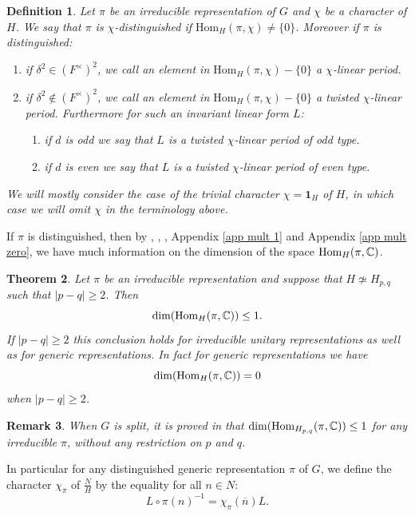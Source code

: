 \documentclass[11pt,letterpaper]{amsart}
\newcommand{\Hom}{\mathrm{Hom}}
\newcommand{\triv}{{\mathbf{1}}}
\def\d{\delta}
\theoremstyle{plain}
\newtheorem{thm}{Theorem}[section] \newtheorem{cor}[thm]{Corollary}
\newtheorem{df}[thm]{Definition}
\newtheorem {rem}[thm]{Remark} \newtheorem{ex}[thm]{Example}
\numberwithin{equation}{section}
\begin{document}
\begin{df}
Let $\pi$ be an irreducible representation of $G$ and $\chi$ be a character of $H$. We say that $\pi$ is $\chi$-distinguished if 
$\Hom_H(\pi,\chi)\neq \{0\}$. 
Moreover if $\pi$ is distinguished:

\begin{enumerate}[1)]
\item if $\d^2\in (F^\times)^2$, we call an element in $\Hom_{H}(\pi,\chi)-\{0\}$ a $\chi$-linear period.
\item if $\d^2\notin (F^\times)^2$, we call an element in $\Hom_{H}(\pi,\chi)-\{0\}$ a twisted $\chi$-linear period. Furthermore 
for such an invariant linear form $L$:
\begin{enumerate} 
\item if $d$ is odd we say that $L$ is a twisted $\chi$-linear period of odd type.
\item if $d$ is even we say that $L$ is a twisted $\chi$-linear period of even type.
\end{enumerate}
\end{enumerate}
We will mostly consider the case of the trivial character $\chi=\triv_H$ of $H$, in which case we will omit $\chi$ in the terminology above.
\end{df}

If $\pi$ is distinguished, then by \cite{JR}, \cite{G}, \cite{BM}, Appendix \ref{app mult 1} and  Appendix \ref{app mult zero}, we have much information on the dimension of the space 
$\Hom_{H}(\pi,\BC)$. 

\begin{thm}\label{thm mult 1}
Let $\pi$ be an irreducible representation and suppose that $H\not \simeq H_{p,q}$ such that $|p-q|\geq 2$. Then 
\[\dim(\Hom_H(\pi,\BC))\leq 1.\] If $|p-q|\geq 2$ this conclusion holds for irreducible unitary representations as well as for generic representations. In fact for generic representations we have \[\dim(\Hom_H(\pi,\BC))=0\] when $|p-q|\geq 2$.
\end{thm}

\begin{rem}
When $G$ is split, it is proved in \cite{JR} that $\dim(\Hom_{H_{p,q}}(\pi,\BC))\leq 1$ for any irreducible $\pi$, without any restriction on $p$ and $q$. 
\end{rem}

In particular for any distinguished generic representation $\pi$ of $G$, we define the character $\chi_\pi$ of 
$\frac{N}{H}$ by the equality for all $n\in N$:
\[L\circ \pi(n)^{-1}=\chi_{\pi}(\overline{n})L.\]
\end{document}
